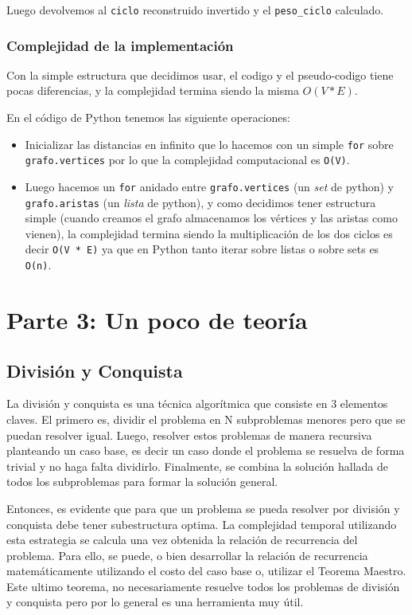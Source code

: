 \documentclass[titlepage,a4paper]{article}
\begin{document}
Luego devolvemos al \texttt{ciclo} reconstruido invertido y el \texttt{peso\_ciclo} calculado.

\subsubsection{Complejidad de la implementación}
\label{sec:org71036ce}

Con la simple estructura que decidimos usar, el codigo y el pseudo-codigo tiene
pocas diferencias, y la complejidad termina siendo la misma \(O(V * E)\).

En el código de Python tenemos las siguiente operaciones:
\begin{itemize}
\item Inicializar las distancias en infinito que lo hacemos con un simple \texttt{for}
sobre \texttt{grafo.vertices} por lo que la complejidad computacional es \texttt{O(V)}.
\item Luego hacemos un \texttt{for} anidado entre \texttt{grafo.vertices} (un \emph{set} de python) y
\texttt{grafo.aristas} (un \emph{lista} de python), y como decidimos tener estructura
simple (cuando creamos el grafo almacenamos los vértices y las aristas como
vienen), la complejidad termina siendo la multiplicación de los dos ciclos es
decir \texttt{O(V * E)} ya que en Python tanto iterar sobre listas o sobre sets es
\texttt{O(n)}.
\end{itemize}

\section{Parte 3: Un poco de teoría}
\label{sec:orgaa0a9cd}

\subsection{División y Conquista}
\label{sec:orgfbe452a}

La división y conquista es una técnica algorítmica que consiste en 3 elementos
claves. El primero es, dividir el problema en N subproblemas menores pero que se
puedan resolver igual. Luego, resolver estos problemas de manera recursiva
planteando un caso base, es decir un caso donde el problema se resuelva de forma
trivial y no haga falta dividirlo. Finalmente, se combina la solución hallada de
todos los subproblemas para formar la solución general.

Entonces, es evidente que para que un problema se pueda resolver por división y
conquista debe tener subestructura optima. La complejidad temporal utilizando
esta estrategia se calcula una vez obtenida la relación de recurrencia del
problema. Para ello, se puede, o bien desarrollar la relación de recurrencia
matemáticamente utilizando el costo del caso base o, utilizar el Teorema
Maestro. Este ultimo teorema, no necesariamente resuelve todos los problemas de
división y conquista pero por lo general es una herramienta muy útil.
\end{document}
